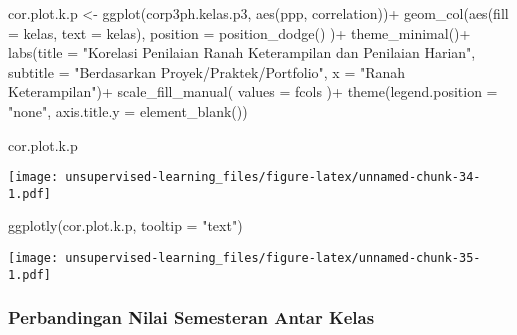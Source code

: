 \documentclass[
]{article}
\newenvironment{Shaded}{\begin{snugshade}}{\end{snugshade}}
\newcommand{\AttributeTok}[1]{\textcolor[rgb]{0.77,0.63,0.00}{#1}}
\newcommand{\FunctionTok}[1]{\textcolor[rgb]{0.00,0.00,0.00}{#1}}
\newcommand{\NormalTok}[1]{#1}
\newcommand{\OtherTok}[1]{\textcolor[rgb]{0.56,0.35,0.01}{#1}}
\newcommand{\SpecialCharTok}[1]{\textcolor[rgb]{0.00,0.00,0.00}{#1}}
\newcommand{\StringTok}[1]{\textcolor[rgb]{0.31,0.60,0.02}{#1}}
\begin{document}
\begin{Shaded}
\begin{Highlighting}[]
\NormalTok{cor.plot.k.p }\OtherTok{\textless{}{-}} 
\FunctionTok{ggplot}\NormalTok{(corp3ph.kelas.p3, }\FunctionTok{aes}\NormalTok{(ppp, correlation))}\SpecialCharTok{+}
    \FunctionTok{geom\_col}\NormalTok{(}\FunctionTok{aes}\NormalTok{(}\AttributeTok{fill =}\NormalTok{ kelas, }\AttributeTok{text =}\NormalTok{ kelas), }
           \AttributeTok{position =} \FunctionTok{position\_dodge}\NormalTok{()}
\NormalTok{           )}\SpecialCharTok{+}
    \FunctionTok{theme\_minimal}\NormalTok{()}\SpecialCharTok{+}
  \FunctionTok{labs}\NormalTok{(}\AttributeTok{title =} \StringTok{"Korelasi Penilaian Ranah Keterampilan dan Penilaian Harian"}\NormalTok{,}
       \AttributeTok{subtitle =} \StringTok{"Berdasarkan Proyek/Praktek/Portfolio"}\NormalTok{,}
       \AttributeTok{x =} \StringTok{"Ranah Keterampilan"}\NormalTok{)}\SpecialCharTok{+}
    \FunctionTok{scale\_fill\_manual}\NormalTok{(}
    \AttributeTok{values =}\NormalTok{ fcols      }
\NormalTok{  )}\SpecialCharTok{+}
  \FunctionTok{theme}\NormalTok{(}\AttributeTok{legend.position =} \StringTok{"none"}\NormalTok{,}
        \AttributeTok{axis.title.y =} \FunctionTok{element\_blank}\NormalTok{())}

\NormalTok{cor.plot.k.p}
\end{Highlighting}
\end{Shaded}

\texttt{[image: unsupervised-learning\_files/figure-latex/unnamed-chunk-34-1.pdf]}

\begin{Shaded}
\begin{Highlighting}[]
\FunctionTok{ggplotly}\NormalTok{(cor.plot.k.p, }\AttributeTok{tooltip =} \StringTok{"text"}\NormalTok{)}
\end{Highlighting}
\end{Shaded}

\texttt{[image: unsupervised-learning\_files/figure-latex/unnamed-chunk-35-1.pdf]}

\hypertarget{perbandingan-nilai-semesteran-antar-kelas}{%
\subsubsection{Perbandingan Nilai Semesteran Antar
Kelas}\label{perbandingan-nilai-semesteran-antar-kelas}}
\end{document}
